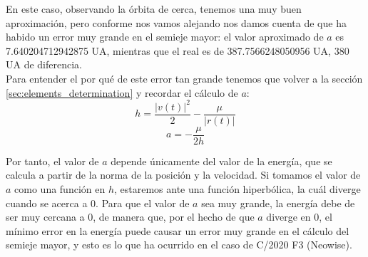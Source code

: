 \documentclass[11pt]{book}
\begin{document}
En este caso, observando la órbita de cerca, tenemos una muy buen aproximación, pero conforme nos vamos alejando nos damos cuenta de que ha habido un error muy grande en el semieje mayor: el valor aproximado de $a$ es 7.640204712942875 UA, mientras que el real es de 387.7566248050956 UA, 380 UA de diferencia.\\

Para entender el por qué de este error tan grande tenemos que volver a la sección \ref{sec:elements_determination} y recordar el cálculo de $a$:
\[
h=\frac{|v(t)|^2}{2}-\frac{\mu}{|r(t)|}
\]
\[
a=-\frac{\mu}{2h}
\]

Por tanto, el valor de $a$ depende únicamente del valor de la energía, que se calcula a partir de la norma de la posición y la velocidad. Si tomamos el valor de $a$ como una función en $h$, estaremos ante una función hiperbólica, la cuál diverge cuando se acerca a 0. Para que el valor de $a$ sea muy grande, la energía debe de ser muy cercana a 0, de manera que, por el hecho de que $a$ diverge en 0, el mínimo error en la energía puede causar un error muy grande en el cálculo del semieje mayor, y esto es lo que ha ocurrido en el caso de C/2020 F3 (Neowise).


\newpage
\thispagestyle{empty}
\end{document}
